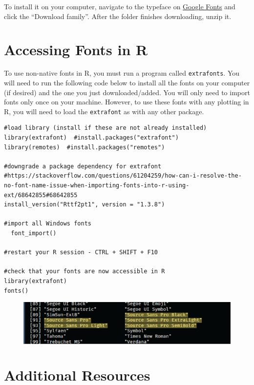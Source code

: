 \documentclass[
  letterpaper,
  DIV=11,
  numbers=noendperiod]{scrreprt}
\begin{document}
To install it on your computer, navigate to the typeface on
\href{https://fonts.google.com/specimen/Source+Sans+Pro}{Google Fonts}
and click the ``Download family''. After the folder finishes
downloading, unzip it.

\hypertarget{accessing-fonts-in-r}{%
\section{Accessing Fonts in R}\label{accessing-fonts-in-r}}

To use non-native fonts in R, you must run a program called
\texttt{extrafonts}. You will need to run the following code below to
install all the fonts on your computer (if desired) and the one you just
downloaded/added. You will only need to import fonts only once on your
machine. However, to use these fonts with any plotting in R, you will
need to load the \texttt{extrafont} as with any other package.

\begin{verbatim}
#load library (install if these are not already installed)
library(extrafont)  #install.packages("extrafont")
library(remotes)  #install.packages("remotes")

#downgrade a package dependency for extrafont
#https://stackoverflow.com/questions/61204259/how-can-i-resolve-the-no-font-name-issue-when-importing-fonts-into-r-using-ext/68642855#68642855
install_version("Rttf2pt1", version = "1.3.8")

#import all Windows fonts
  font_import()
  
#restart your R session - CTRL + SHIFT + F10

#check that your fonts are now accessible in R
library(extrafont)
fonts()
\end{verbatim}

\begin{figure}

{\centering \includegraphics{./images/typeface_setup-typeface_installed.png}

}

\end{figure}

\hypertarget{additional-resources-1}{%
\section{Additional Resources}\label{additional-resources-1}}
\end{document}
